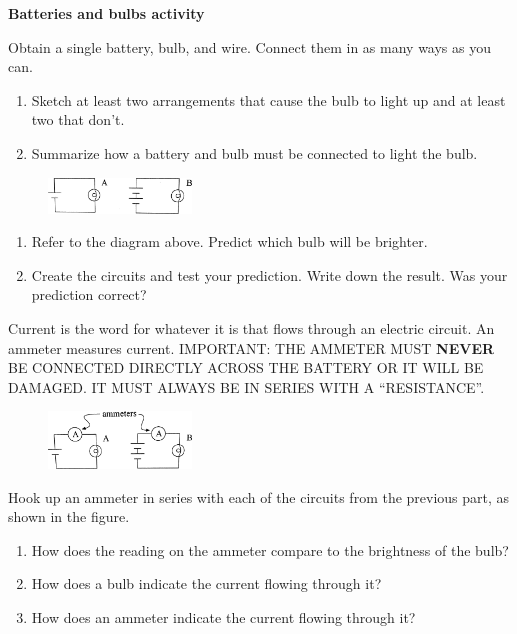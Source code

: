 \documentclass{article}
\begin{document}
\begin{center}
  \Large\textbf{Batteries and bulbs activity}
\end{center}

Obtain a single battery, bulb, and wire. Connect them in as many ways as you can.
\begin{enumerate}
  \item  Sketch at least two arrangements that cause the bulb to light up and at least two that don't.
  \item Summarize how a battery and bulb must be connected to light the bulb.
\end{enumerate}

\begin{figure}[h]
  \centering
  \includegraphics[width=1.5in]{1.png}
\end{figure}
\begin{enumerate}[resume]
  \item Refer to the diagram above. Predict which bulb will be brighter.
  \item Create the circuits and test your prediction. Write down the result. Was your prediction correct?
\end{enumerate}

Current is the word for whatever it is that flows through an electric circuit.
An ammeter measures current. IMPORTANT: THE AMMETER MUST \textbf{NEVER} BE CONNECTED DIRECTLY ACROSS THE BATTERY OR IT WILL BE DAMAGED. IT MUST ALWAYS BE IN SERIES WITH A ``RESISTANCE''.
\begin{figure}[h]
  \centering
  \includegraphics[width=1.5in]{2.png}
\end{figure}
Hook up an ammeter in series with each of the circuits from the previous part, as shown in the figure.
\begin{enumerate}[resume]
  \item How does the reading on the ammeter compare to the brightness of the bulb?
  \item How does a bulb indicate the current flowing through it?
  \item How does an ammeter indicate the current flowing through it?
\end{enumerate}
\end{document}
